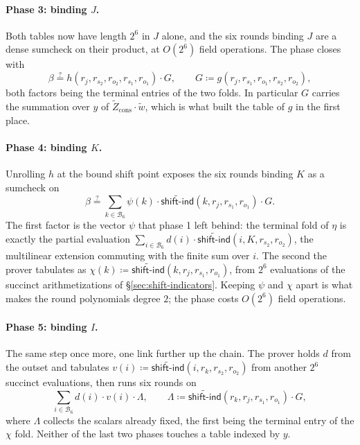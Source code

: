 \documentclass{article}
\theoremstyle{definition}
\newcommand*{\mle}{\widetilde}
\newcommand{\BB}{\mathcal{B}}
\begin{document}
\paragraph{Phase 3: binding $J$.}
Both tables now have length $2^6$ in $J$ alone, and the six rounds binding $J$ are a dense sumcheck on their product, at $O(2^6)$ field operations. The phase closes with
\[
  \beta \stackrel{?}{=} h(r_j, r_{s_2}, r_{o_2}, r_{s_1}, r_{o_1}) \cdot G, \qquad G \coloneqq g(r_j, r_{s_1}, r_{o_1}, r_{s_2}, r_{o_2}),
\]
both factors being the terminal entries of the two folds. In particular $G$ carries the summation over $y$ of $\mle{Z}_\text{cons} \cdot \mle{w}$, which is what built the table of $g$ in the first place.

\paragraph{Phase 4: binding $K$.}
Unrolling $h$ at the bound shift point exposes the six rounds binding $K$ as a sumcheck on
\[
  \beta \stackrel{?}{=} \sum_{k \in \BB_6} \psi(k) \cdot \mle{\textsf{shift-ind}}(k, r_j, r_{s_1}, r_{o_1}) \cdot G.
\]
The first factor is the vector $\psi$ that phase 1 left behind: the terminal fold of $\eta$ is exactly the partial evaluation $\sum_{i \in \BB_6} d(i) \cdot \mle{\textsf{shift-ind}}(i, K, r_{s_2}, r_{o_2})$, the multilinear extension commuting with the finite sum over $i$. The second the prover tabulates as $\chi(k) \coloneqq \mle{\textsf{shift-ind}}(k, r_j, r_{s_1}, r_{o_1})$, from $2^6$ evaluations of the succinct arithmetizations of \S\ref{sec:shift-indicators}. Keeping $\psi$ and $\chi$ apart is what makes the round polynomials degree $2$; the phase costs $O(2^6)$ field operations.

\paragraph{Phase 5: binding $I$.}
The same step once more, one link further up the chain. The prover holds $d$ from the outset and tabulates $v(i) \coloneqq \mle{\textsf{shift-ind}}(i, r_k, r_{s_2}, r_{o_2})$ from another $2^6$ succinct evaluations, then runs six rounds on
\[
  \sum_{i \in \BB_6} d(i) \cdot v(i) \cdot \Lambda, \qquad \Lambda \coloneqq \mle{\textsf{shift-ind}}(r_k, r_j, r_{s_1}, r_{o_1}) \cdot G,
\]
where $\Lambda$ collects the scalars already fixed, the first being the terminal entry of the $\chi$ fold. Neither of the last two phases touches a table indexed by $y$.
\end{document}
